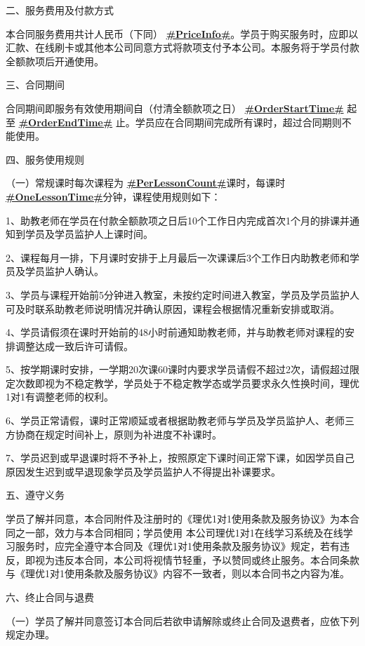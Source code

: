 \documentclass {ctexart}
\begin{document}
二、服务费用及付款方式


本合同服务费用共计人民币（下同）  \textbf{\underline{#PriceInfo#}}。学员于购买服务时，应即以汇款、在线刷卡或其他本公司同意方式将款项支付予本公司。本服务将于学员付款全额款项后开通使用。



三、合同期间



合同期间即服务有效使用期间自（付清全额款项之日） \textbf{\underline{#OrderStartTime#}} 起至  \textbf{\underline{#OrderEndTime#}} 止。学员应在合同期间完成所有课时，超过合同期则不能使用。


四、服务使用规则


（一）常规课时每次课程为 \underline{\textbf{#PerLessonCount#}}课时，每课时 \underline{\textbf{#OneLessonTime#}}分钟，课程使用规则如下：


1、助教老师在学员在付款全额款项之日后10个工作日内完成首次1个月的排课并通知到学员及学员监护人上课时间。


2、课程每月一排，下月课时安排于上月最后一次课课后3个工作日内助教老师和学员及学员监护人确认。


3、学员与课程开始前5分钟进入教室，未按约定时间进入教室，学员及学员监护人可及时联系助教老师说明情况并确认原因，课程会根据情况重新安排或取消。


4、学员请假须在课时开始前的48小时前通知助教老师，并与助教老师对课程的安排调整达成一致后许可请假。


5、按学期课时安排，一学期20次课60课时内要求学员请假不超过2次，请假超过限定次数即视为不稳定教学，学员处于不稳定教学态或学员要求永久性换时间，理优1对1有调整老师的权利。


6、学员正常请假，课时正常顺延或者根据助教老师与学员及学员监护人、老师三方协商在规定时间补上，原则为补进度不补课时。


7、学员迟到或早退课时将不予补上，按照原定下课时间正常下课，如因学员自己原因发生迟到或早退现象学员及学员监护人不得提出补课要求。



五、遵守义务


学员了解并同意，本合同附件及注册时的《理优1对1使用条款及服务协议》为本合同之一部，效力与本合同相同；学员使用 本公司理优1对1在线学习系统及在线学习服务时，应完全遵守本合同及《理优1对1使用条款及服务协议》规定，若有违反，即视为违反本合同，本公司将视情节轻重，予以赞同或终止服务。本合同条款与《理优1对1使用条款及服务协议》内容不一致者，则以本合同书之内容为准。


六、终止合同与退费


（一）学员了解并同意签订本合同后若欲申请解除或终止合同及退费者，应依下列规定办理。
\end{document}
